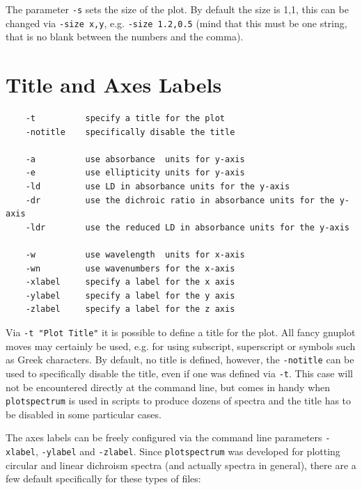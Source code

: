 \documentclass[12pt, a4paper]{article}
\begin{document}
The parameter \verb'-s' sets the size of the plot. By default the size is 1,1, this can be changed via \verb'-size x,y', e.g. \verb'-size 1.2,0.5' (mind that this must be one string, that is no blank between the numbers and the comma).




\section{Title and Axes Labels}

\begin{verbatim}
    -t          specify a title for the plot
    -notitle    specifically disable the title

    -a          use absorbance  units for y-axis
    -e          use ellipticity units for y-axis
    -ld         use LD in absorbance units for the y-axis
    -dr         use the dichroic ratio in absorbance units for the y-axis
    -ldr        use the reduced LD in absorbance units for the y-axis

    -w          use wavelength  units for x-axis
    -wn         use wavenumbers for the x-axis
    -xlabel     specify a label for the x axis
    -ylabel     specify a label for the y axis
    -zlabel     specify a label for the z axis
\end{verbatim}

Via \texttt{-t "Plot Title"} it is possible to define a title for the plot. All fancy gnuplot moves may certainly be used, e.g. for using subscript, superscript or symbols such as Greek characters. By default, no title is defined, however, the \verb'-notitle' can be used to specifically disable the title, even if one was defined via \verb'-t'. This case will not be encountered directly at the command line, but comes in handy when \verb'plotspectrum' is used in scripts to produce dozens of spectra and the title has to be disabled in some particular cases.

The axes labels can be freely configured via the command line parameters \verb'-xlabel', \verb'-ylabel' and \verb'-zlabel'. Since \verb'plotspectrum' was developed for plotting circular and linear dichroism spectra (and actually spectra in general), there are a few default specifically for these types of files:
\end{document}

